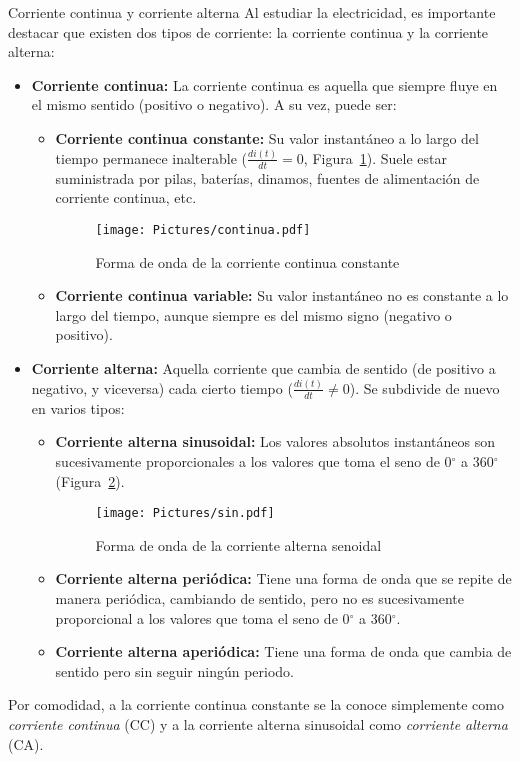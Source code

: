 \documentclass[11pt]{book} %
\makeatletter
\numberwithin{dummy}{section}
\theoremstyle{ocrenumbox}
\theoremstyle{blacknumex}
\theoremstyle{blacknumbox}
\theoremstyle{ocrenum}
\renewcommand{\subsubsection}{\@startsection {subsubsection}{3}{\z@}
{-2ex \@plus -0.1ex \@minus -.2ex}
{.2ex \@plus.2ex }
{\normalfont\small\sffamily\bfseries}}
\makeatother
\begin{document}
	\subsubsection{Corriente continua y corriente alterna} \label{sec.cc-ca}
	Al estudiar la electricidad, es importante destacar que existen dos tipos de corriente: la corriente continua y la corriente alterna:
	\begin{itemize}
		\item \textbf{Corriente continua:} La corriente continua es aquella que siempre fluye en el mismo sentido (positivo o negativo). A su vez, puede ser:
		\begin{itemize}
			\item \textbf{Corriente continua constante:} Su valor instantáneo a lo largo del tiempo permanece inalterable ($\frac{di(t)}{dt} = 0$, Figura~\ref{fig.continua}). Suele estar suministrada por pilas, baterías, dinamos, fuentes de alimentación de corriente continua, etc. 
			\begin{figure}[htbp]
				\centering
				\texttt{[image: Pictures/continua.pdf]}
				\caption{Forma de onda de la corriente continua constante}
				\label{fig.continua}
			\end{figure}
			\item \textbf{Corriente continua variable:} Su valor instantáneo no es constante a lo largo del tiempo, aunque siempre es del mismo signo (negativo o positivo). 
		\end{itemize}
		\item \textbf{Corriente alterna:} Aquella corriente que cambia de sentido (de positivo a negativo, y viceversa) cada cierto tiempo ($\frac{di(t)}{dt} \neq 0$). Se subdivide de nuevo en varios tipos:
		\begin{itemize}
			\item \textbf{Corriente alterna sinusoidal:} Los valores absolutos instantáneos son sucesivamente proporcionales a los valores que toma el seno de 0$^\circ$ a 360$^\circ$ (Figura~\ref{fig.sin}).
			\begin{figure}[htbp]
				\centering
				\texttt{[image: Pictures/sin.pdf]}
				\caption{Forma de onda de la corriente alterna senoidal}
				\label{fig.sin}
			\end{figure}
			\item \textbf{Corriente alterna periódica:} Tiene una forma de onda que se repite de manera periódica, cambiando de sentido, pero no es sucesivamente proporcional a los valores que toma el seno de 0$^\circ$ a 360$^\circ$.
			\item \textbf{Corriente alterna aperiódica:} Tiene una forma de onda que cambia de sentido pero sin seguir ningún periodo.
		\end{itemize}
	\end{itemize}
	Por comodidad, a la corriente continua constante se la conoce simplemente como \textit{corriente continua} (CC) y a la corriente alterna sinusoidal como \textit{corriente alterna} (CA).
	
\end{document}
